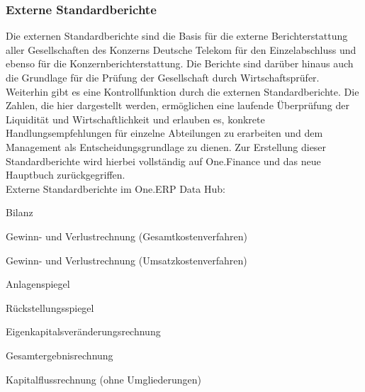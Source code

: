 \subsubsection{Externe Standardberichte}
Die externen Standardberichte sind die Basis für die externe Berichterstattung aller Gesellschaften des Konzerns Deutsche Telekom für den Einzelabschluss und ebenso für die Konzernberichterstattung. Die Berichte sind darüber hinaus auch die Grundlage für die Prüfung der Gesellschaft durch Wirtschaftsprüfer. 
Weiterhin gibt es eine Kontrollfunktion durch die externen Standardberichte. Die Zahlen, die hier dargestellt werden, ermöglichen eine laufende Überprüfung der Liquidität und Wirtschaftlichkeit und erlauben es, konkrete Handlungsempfehlungen für einzelne Abteilungen zu erarbeiten und dem Management als Entscheidungsgrundlage zu dienen. Zur Erstellung dieser Standardberichte wird hierbei vollständig auf One.Finance und das neue Hauptbuch zurückgegriffen. \\
Externe Standardberichte im One.ERP Data Hub:
\begin{compactitem}  
\item 	  Bilanz
\item     Gewinn- und Verlustrechnung (Gesamtkostenverfahren)
\item     Gewinn- und Verlustrechnung (Umsatzkostenverfahren)
\item     Anlagenspiegel
\item    Rückstellungsspiegel
 \item    Eigenkapitalsveränderungsrechnung
\item     Gesamtergebnisrechnung
 \item    Kapitalflussrechnung (ohne Umgliederungen)
\end{compactitem}
